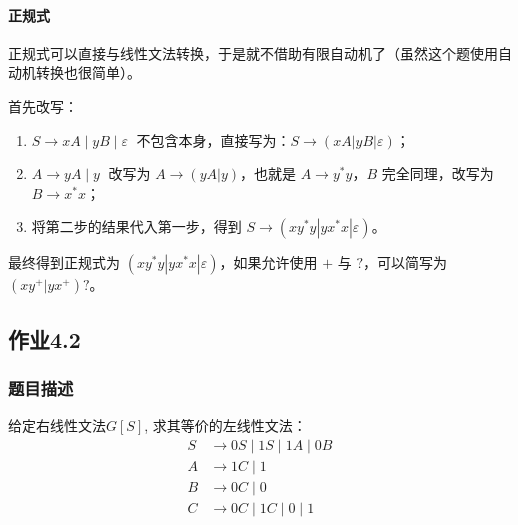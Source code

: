 \begin{center}
\end{center}

\paragraph{正规式} 正规式可以直接与线性文法转换，于是就不借助有限自动机了（虽然这个题使用自动机转换也很简单）。

首先改写：

\begin{enumerate}
    \item $S \rightarrow xA\;|\;yB\;|\;\varepsilon\;$ 不包含本身，直接写为：$S \rightarrow (xA|yB|\varepsilon)$；
    \item $A \rightarrow yA\;|\;y\;$ 改写为 $A \rightarrow (yA|y)$，也就是 $A\rightarrow y^*y$，$B$ 完全同理，改写为 $B\rightarrow x^*x$；
    \item 将第二步的结果代入第一步，得到 $S \rightarrow (xy^*y|yx^*x|\varepsilon)$。
\end{enumerate}

最终得到正规式为 $(xy^*y|yx^*x|\varepsilon)$，如果允许使用 $+$ 与 $?$，可以简写为 $(xy^+|yx^+)?$。

\subsection{作业4.2}
\subsubsection{题目描述}
给定右线性文法$G[S]$, 求其等价的左线性文法：
\begin{align*}
    S&\rightarrow 0S\;|\;1S\;|\;1A\;|\;0B\\
    A&\rightarrow 1C\;|\;1\\
    B&\rightarrow 0C\;|\;0\\
    C&\rightarrow 0C\;|\;1C\;|\;0\;|\;1
\end{align*}
